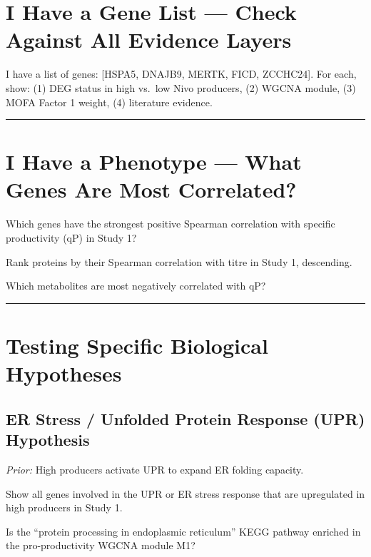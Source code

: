 \documentclass[
  letterpaper,
  oneside,
  open=any]{scrbook}
\begin{document}
\section{I Have a Gene List --- Check Against All Evidence
Layers}\label{i-have-a-gene-list-check-against-all-evidence-layers}

I have a list of genes: {[}HSPA5, DNAJB9, MERTK, FICD, ZCCHC24{]}. For
each, show: (1) DEG status in high vs.~low Nivo producers, (2) WGCNA
module, (3) MOFA Factor 1 weight, (4) literature evidence.

\begin{center}\rule{0.5\linewidth}{0.5pt}\end{center}

\section{I Have a Phenotype --- What Genes Are Most
Correlated?}\label{i-have-a-phenotype-what-genes-are-most-correlated}

Which genes have the strongest positive Spearman correlation with
specific productivity (qP) in Study 1?

Rank proteins by their Spearman correlation with titre in Study 1,
descending.

Which metabolites are most negatively correlated with qP?

\begin{center}\rule{0.5\linewidth}{0.5pt}\end{center}

\section{Testing Specific Biological
Hypotheses}\label{testing-specific-biological-hypotheses}

\subsection{ER Stress / Unfolded Protein Response (UPR)
Hypothesis}\label{er-stress-unfolded-protein-response-upr-hypothesis}

\emph{Prior:} High producers activate UPR to expand ER folding capacity.

Show all genes involved in the UPR or ER stress response that are
upregulated in high producers in Study 1.

Is the ``protein processing in endoplasmic reticulum'' KEGG pathway
enriched in the pro-productivity WGCNA module M1?
\end{document}

